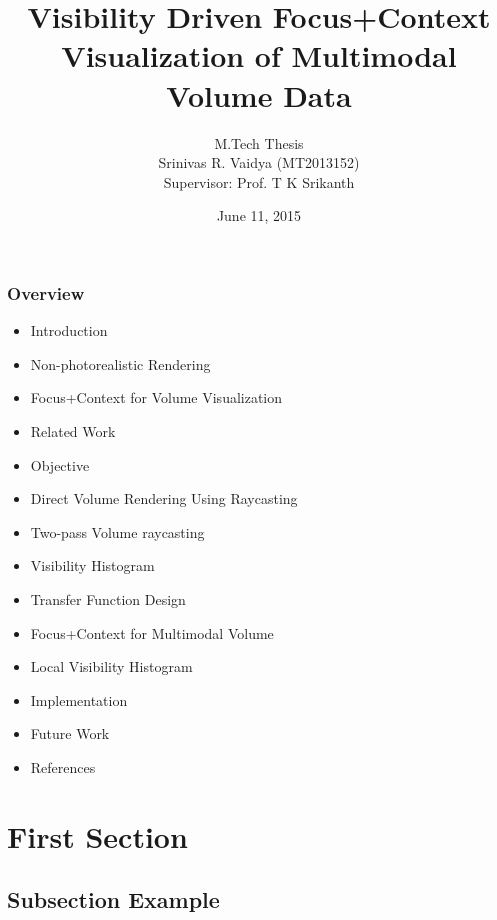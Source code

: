 \documentclass{beamer}
\title[]{Visibility Driven Focus+Context Visualization of
Multimodal Volume Data} %
\author{M.Tech Thesis \\Srinivas R. Vaidya (MT2013152) \\
Supervisor: Prof. T K Srikanth } %
\institute[IIITB] %
{International Institute Of Information Technology, Bangalore \\ %
\medskip
\textit{} %
}
\date{June 11, 2015} %
\begin{document}
\begin{frame}
\titlepage %
\end{frame}

\begin{frame}
\frametitle{Overview} %
\begin{itemize}
\item Introduction
\item Non-photorealistic Rendering
\item Focus+Context for Volume Visualization
\item Related Work
\item Objective
\item Direct Volume Rendering Using Raycasting
\item Two-pass Volume raycasting
\item Visibility Histogram
\item Transfer Function Design
\item Focus+Context for Multimodal Volume
\item Local Visibility Histogram
\item Implementation
\item Future Work
\item References
\end{itemize}
\end{frame}


\section{First Section} %

\subsection{Subsection Example} %
\end{document}
